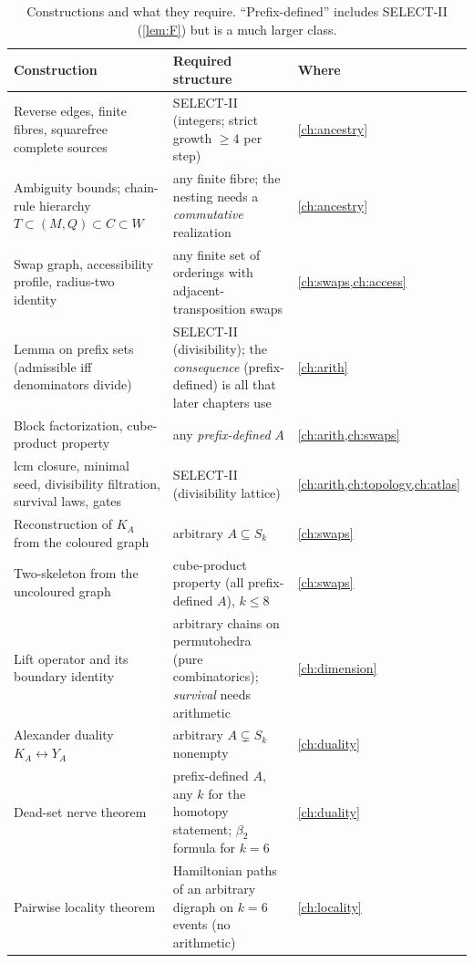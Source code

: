 \begin{table}[ht]\centering\small
\begin{tabularx}{\textwidth}{@{}>{\raggedright\arraybackslash}p{4.2cm}>{\raggedright\arraybackslash}X>{\raggedright\arraybackslash}p{2.2cm}@{}}
\toprule
Construction & Required structure & Where\\\midrule
Reverse edges, finite fibres, squarefree complete sources & SELECT-II (integers; strict growth $\ge4$ per step) & \cref{ch:ancestry}\\
Ambiguity bounds; chain-rule hierarchy $T\!\subset\!(M,Q)\!\subset\!C\!\subset\!W$ & any finite fibre; the nesting needs a \emph{commutative} realization & \cref{ch:ancestry}\\
Swap graph, accessibility profile, radius-two identity & any finite set of orderings with adjacent-transposition swaps & \cref{ch:swaps,ch:access}\\
Lemma on prefix sets (admissible iff denominators divide) & SELECT-II (divisibility); the \emph{consequence} (prefix-defined) is all that later chapters use & \cref{ch:arith}\\
Block factorization, cube-product property & any \emph{prefix-defined} $A$ & \cref{ch:arith,ch:swaps}\\
lcm closure, minimal seed, divisibility filtration, survival laws, gates & SELECT-II (divisibility lattice) & \cref{ch:arith,ch:topology,ch:atlas}\\
Reconstruction of $K_A$ from the coloured graph & arbitrary $A\subseteq S_k$ & \cref{ch:swaps}\\
Two-skeleton from the uncoloured graph & cube-product property (all prefix-defined $A$), $k\le8$ & \cref{ch:swaps}\\
Lift operator and its boundary identity & arbitrary chains on permutohedra (pure combinatorics); \emph{survival} needs arithmetic & \cref{ch:dimension}\\
Alexander duality $K_A\leftrightarrow Y_A$ & arbitrary $A\subsetneq S_k$ nonempty & \cref{ch:duality}\\
Dead-set nerve theorem & prefix-defined $A$, any $k$ for the homotopy statement; $\beta_2$ formula for $k=6$ & \cref{ch:duality}\\
Pairwise locality theorem & Hamiltonian paths of an arbitrary digraph on $k=6$ events (no arithmetic) & \cref{ch:locality}\\
\bottomrule
\end{tabularx}
\caption{Constructions and what they require. ``Prefix-defined'' includes SELECT-II (\cref{lem:F}) but is a much larger class.}\label{tab:needs}
\end{table}

